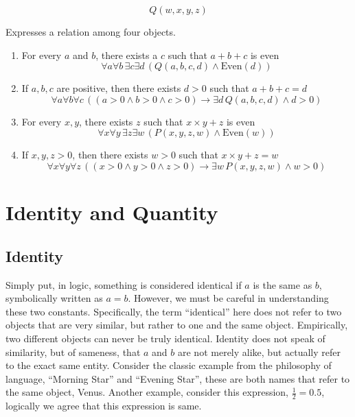 \documentclass[12pt,a4paper,openany]{article}
\begin{document}
\[Q(w,x,y,z)\]

Expresses a relation among four objects.

\begin{enumerate}
\item
  For every \(a\) and \(b\), there exists a \(c\) such that \(a+b+c\) is
  even
  \[\forall a \forall b \, \exists c \exists d \, (Q(a,b,c,d) \land \text{Even}(d))\]
\item
  If \(a,b,c\) are positive, then there exists \(d>0\) such that
  \(a+b+c=d\)
  \[\forall a \forall b \forall c \, ((a>0 \land b>0 \land c>0) \rightarrow \exists d \, Q(a,b,c,d) \land d>0)\]
\item
  For every \(x,y\), there exists \(z\) such that \(x \times y + z\) is
  even
  \[\forall x \forall y \, \exists z \exists w \, (P(x,y,z,w) \land \text{Even}(w))\]
\item
  If \(x,y,z>0\), then there exists \(w>0\) such that
  \(x \times y + z = w\)
  \[\forall x \forall y \forall z \, ((x>0 \land y>0 \land z>0) \rightarrow \exists w \, P(x,y,z,w) \land w>0)\]
\end{enumerate}




\section{Identity and Quantity} 

\subsection{Identity}
\label{identity}

Simply put, in logic, something is considered identical if \(a\) is the
same as \(b\), symbolically written as \(a = b\). However, we must be
careful in understanding these two constants. Specifically, the term
``identical'' here does not refer to two objects that are very similar,
but rather to one and the same object. Empirically, two
different objects can never be truly identical. Identity does not speak
of similarity, but of sameness, that \(a\) and \(b\) are not merely
alike, but actually refer to the exact same entity. Consider the classic
example from the philosophy of language, ``Morning Star'' and ``Evening
Star'', these are both names that refer to the same object, Venus.
Another example, consider this expression, \(\frac{1}{2} = 0.5\),
logically we agree that this expression is same.
\end{document}
